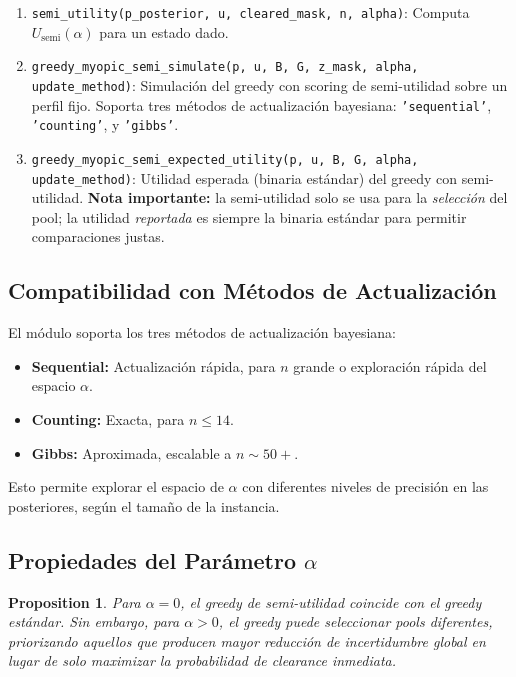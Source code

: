 \documentclass[11pt, a4paper]{article}
\newtheorem{proposition}{Proposition}
\begin{document}
\begin{enumerate}[nosep]
    \item \texttt{semi\_utility(p\_posterior, u, cleared\_mask, n, alpha)}:
    Computa $U_{\text{semi}}(\alpha)$ para un estado dado.

    \item \texttt{greedy\_myopic\_semi\_simulate(p, u, B, G, z\_mask,
    alpha, update\_method)}:
    Simulaci\'on del greedy con scoring de semi-utilidad sobre un perfil
    fijo. Soporta tres m\'etodos de actualizaci\'on bayesiana:
    \texttt{'sequential'}, \texttt{'counting'}, y \texttt{'gibbs'}.

    \item \texttt{greedy\_myopic\_semi\_expected\_utility(p, u, B, G,
    alpha, update\_method)}:
    Utilidad esperada (binaria est\'andar) del greedy con semi-utilidad.
    \textbf{Nota importante:} la semi-utilidad solo se usa para la
    \textit{selecci\'on} del pool; la utilidad \textit{reportada} es
    siempre la binaria est\'andar para permitir comparaciones justas.
\end{enumerate}

\subsection{Compatibilidad con M\'etodos de Actualizaci\'on}
El m\'odulo soporta los tres m\'etodos de actualizaci\'on bayesiana:
\begin{itemize}[nosep]
    \item \textbf{Sequential:} Actualizaci\'on r\'apida, para $n$ grande
    o exploraci\'on r\'apida del espacio $\alpha$.
    \item \textbf{Counting:} Exacta, para $n \leq 14$.
    \item \textbf{Gibbs:} Aproximada, escalable a $n \sim 50+$.
\end{itemize}

Esto permite explorar el espacio de $\alpha$ con diferentes niveles de
precisi\'on en las posteriores, seg\'un el tama\~no de la instancia.

\subsection{Propiedades del Par\'ametro $\alpha$}

\begin{proposition}
Para $\alpha = 0$, el greedy de semi-utilidad coincide con el greedy
est\'andar. Sin embargo, para $\alpha > 0$, el greedy puede seleccionar
pools diferentes, priorizando aquellos que producen mayor reducci\'on
de incertidumbre global en lugar de solo maximizar la probabilidad de
clearance inmediata.
\end{proposition}
\end{document}
